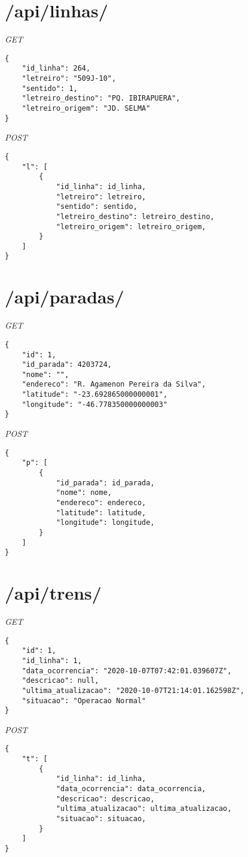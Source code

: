 \section{/api/linhas/}
\textit{GET}
\begin{lstlisting}
{
    "id_linha": 264,
    "letreiro": "509J-10",
    "sentido": 1,
    "letreiro_destino": "PQ. IBIRAPUERA",
    "letreiro_origem": "JD. SELMA"
}
\end{lstlisting}
\textit{POST}
\begin{lstlisting}
{
    "l": [
        {
            "id_linha": id_linha,
            "letreiro": letreiro,
            "sentido": sentido,
            "letreiro_destino": letreiro_destino,
            "letreiro_origem": letreiro_origem,
        }
    ]
}    
\end{lstlisting}
\section{/api/paradas/}
\textit{GET}
\begin{lstlisting}
{
    "id": 1,
    "id_parada": 4203724,
    "nome": "",
    "endereco": "R. Agamenon Pereira da Silva",
    "latitude": "-23.692865000000001",
    "longitude": "-46.778350000000003"
}
\end{lstlisting}
\textit{POST}
\begin{lstlisting}
{
    "p": [
        {
            "id_parada": id_parada,
            "nome": nome,
            "endereco": endereco,
            "latitude": latitude,
            "longitude": longitude,
        }
    ]
}
\end{lstlisting}
\section{/api/trens/}
\textit{GET}
\begin{lstlisting}
{
    "id": 1,
    "id_linha": 1,
    "data_ocorrencia": "2020-10-07T07:42:01.039607Z",
    "descricao": null,
    "ultima_atualizacao": "2020-10-07T21:14:01.162598Z",
    "situacao": "Operacao Normal"
}
\end{lstlisting}
\textit{POST}
\begin{lstlisting}
{
    "t": [
        {
            "id_linha": id_linha,
            "data_ocorrencia": data_ocorrencia,
            "descricao": descricao,
            "ultima_atualizacao": ultima_atualizacao,
            "situacao": situacao,
        }
    ]
}
\end{lstlisting}
